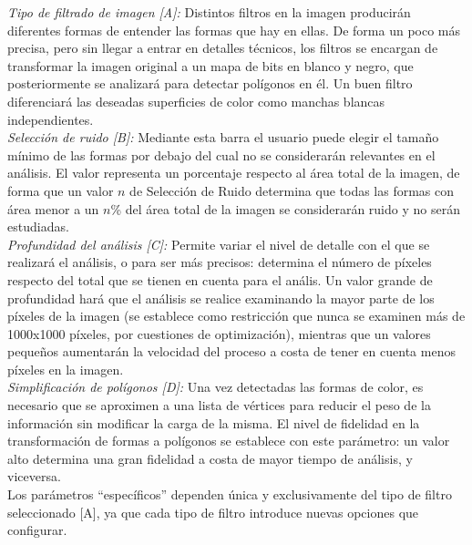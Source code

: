 		\noindent\textit{Tipo de filtrado de imagen [A]:} Distintos filtros en la imagen producirán diferentes formas de entender las formas que hay en ellas. De forma un poco más precisa, pero sin llegar a entrar en detalles técnicos, los filtros se encargan de transformar la imagen original a un mapa de bits en blanco y negro, que posteriormente se analizará para detectar polígonos en él. Un buen filtro diferenciará las deseadas superficies de color como manchas blancas independientes.\\
		
		\noindent\textit{Selección de ruido [B]:} Mediante esta barra el usuario puede elegir el tamaño mínimo de las formas por debajo del cual no se considerarán relevantes en el análisis. El valor representa un porcentaje respecto al área total de la imagen, de forma que un valor $n$ de Selección de Ruido determina que todas las formas con área menor a un $n$\% del área total de la imagen se considerarán ruido y no serán estudiadas.\\
		
		\color{blue}\noindent\textit{Profundidad del análisis [C]:} Permite variar el nivel de detalle con el que se realizará el análisis, o para ser más precisos: determina el número de píxeles respecto del total que se tienen en cuenta para el anális. Un valor grande de profundidad hará que el análisis se realice examinando la mayor parte de los píxeles de la imagen (se establece como restricción que nunca se examinen más de 1000x1000 píxeles, por cuestiones de optimización), mientras que un valores pequeños aumentarán la velocidad del proceso a costa de tener en cuenta menos píxeles en la imagen. \color{black}\\
		
		\noindent\textit{Simplificación de polígonos [D]:} Una vez detectadas las formas de color, es necesario que se aproximen a una lista de vértices para reducir el peso de la información sin modificar la carga de la misma. El nivel de fidelidad en la transformación de formas a polígonos se establece con este parámetro: un valor alto determina una gran fidelidad a costa de mayor tiempo de análisis, y viceversa.\\

		
		\vspace{0.2in}Los parámetros ``específicos'' dependen única y exclusivamente del tipo de filtro seleccionado [A], ya que cada tipo de filtro introduce nuevas opciones que configurar. \\
		
